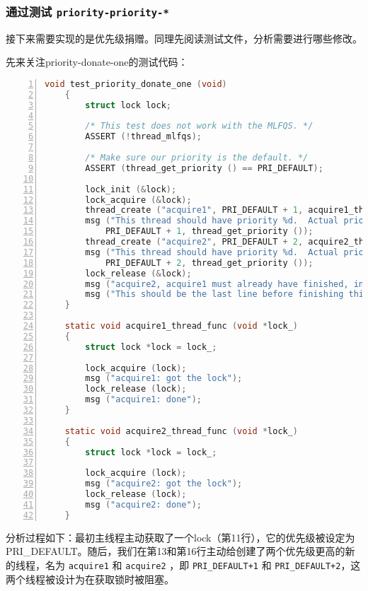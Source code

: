 \documentclass{article}
\begin{document}
	\subsubsection{通过测试 \texttt{priority-priority-*} }
	
	接下来需要实现的是优先级捐赠。同理先阅读测试文件，分析需要进行哪些修改。
	
	先来关注priority-donate-one的测试代码：
	
	\begin{lstlisting}[xleftmargin = 4em,xrightmargin = 4em, aboveskip = 1em, numbers = left, language = C, title=\texttt{thread\_create}函数结尾补充：]
    void test_priority_donate_one (void)
    {
    	struct lock lock;
    	
    	/* This test does not work with the MLFQS. */
    	ASSERT (!thread_mlfqs);
    	
    	/* Make sure our priority is the default. */
    	ASSERT (thread_get_priority () == PRI_DEFAULT);
    	
    	lock_init (&lock);
    	lock_acquire (&lock);
    	thread_create ("acquire1", PRI_DEFAULT + 1, acquire1_thread_func, &lock);
    	msg ("This thread should have priority %d.  Actual priority: %d.",
    	    PRI_DEFAULT + 1, thread_get_priority ());
    	thread_create ("acquire2", PRI_DEFAULT + 2, acquire2_thread_func, &lock);
    	msg ("This thread should have priority %d.  Actual priority: %d.",
    	    PRI_DEFAULT + 2, thread_get_priority ());
    	lock_release (&lock);
    	msg ("acquire2, acquire1 must already have finished, in that order.");
    	msg ("This should be the last line before finishing this test.");
    }
    
    static void acquire1_thread_func (void *lock_)
    {
    	struct lock *lock = lock_;
    	
    	lock_acquire (lock);
    	msg ("acquire1: got the lock");
    	lock_release (lock);
    	msg ("acquire1: done");
    }
    
    static void acquire2_thread_func (void *lock_)
    {
    	struct lock *lock = lock_;
    	
    	lock_acquire (lock);
    	msg ("acquire2: got the lock");
    	lock_release (lock);
    	msg ("acquire2: done");
    }
	\end{lstlisting}
	
	分析过程如下：最初主线程主动获取了一个lock（第11行），它的优先级被设定为PRI\_DEFAULT。随后，我们在第13和第16行主动给创建了两个优先级更高的新的线程，名为 \texttt{acquire1} 和 \texttt{acquire2} ，即 \texttt{PRI\_DEFAULT+1} 和 \texttt{PRI\_DEFAULT+2}，这两个线程被设计为在获取锁时被阻塞。
	
\end{document}

